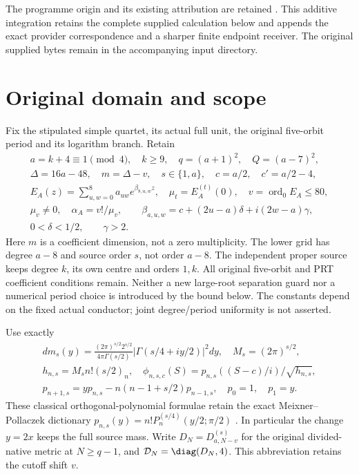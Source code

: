 The programme origin and its existing attribution are retained
\cite{peq:human:globalization2026,peq:human:splitzero2026}. This additive
integration retains the complete supplied calculation below and appends
the exact provider correspondence and a sharper finite endpoint receiver.
The original supplied bytes remain in the accompanying input directory.

\section{Original domain and scope}
Fix the stipulated simple quartet, its actual full unit, the original five-orbit period and its logarithm branch. Retain
\begin{equation}
\begin{gathered}
 a=k+4\equiv1\pmod4,\quad k\ge9,\quad q=(a+1)^2,\quad Q=(a-7)^2,\\
 \Delta=16a-48,\quad m=\Delta-v,\quad s\in\{1,a\},\quad
 c=a/2,\quad c'=a/2-4,\\
 E_A(z)=\sum_{u,w=0}^8a_{uw}e^{\beta_{8,u,w}z},\quad
 \mu_t=E_A^{(t)}(0),\quad v=\operatorname{ord}_0E_A\le80,\\
 \mu_v\ne0,\quad \alpha_A=v!/\mu_v,\qquad
 \beta_{a,u,w}=c+(2u-a)\delta+i(2w-a)\gamma,\\
 0<\delta<1/2,\qquad\gamma>2.
\end{gathered}\label{peq:peq:data}
\end{equation}
Here $m$ is a coefficient dimension, not a zero multiplicity. The lower grid has degree $a-8$ and source order $s$, not order $a-8$. The independent proper source keeps degree $k$, its own centre and orders $1,k$. All original five-orbit and PRT coefficient conditions remain. Neither a new large-root separation guard nor a numerical period choice is introduced by the bound below. The constants depend on the fixed actual conductor; joint degree/period uniformity is not asserted.

Use exactly
\begin{equation}
\begin{gathered}
 dm_s(y)=\frac{(2\pi)^{s/2}2^{s/2}}{4\pi\Gamma(s/2)}
 |\Gamma(s/4+iy/2)|^2dy,\quad M_s=(2\pi)^{s/2},\\
 h_{n,s}=M_sn!(s/2)_n,\quad
 \phi_{n,s,c}(S)=p_{n,s}((S-c)/i)/\sqrt{h_{n,s}},\\
 p_{n+1,s}=yp_{n,s}-n(n-1+s/2)p_{n-1,s},\quad p_0=1,\quad p_1=y.
\end{gathered}\label{peq:peq:gamma}
\end{equation}
These classical orthogonal-polynomial formulae retain the exact
Meixner--Pollaczek dictionary
$p_{n,s}(y)=n!P_n^{(s/4)}(y/2;\pi/2)$
\cite[eqs.~(18.19.8)--(18.19.9), (18.23.7)]{peq:human:dlmf18}.
In particular the change $y=2x$ keeps the full source mass.
Write $D_N=D_{a,N-v}^{(s)}$ for the original divided-native metric at $N\ge q-1$, and $\mathcal D_N=\diag(D_N,4)$. This abbreviation retains the cutoff shift $v$.

